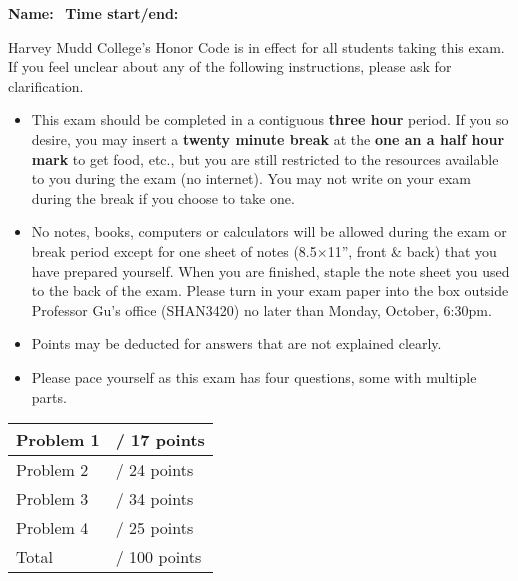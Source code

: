 \documentclass[letter, 12pt]{article}
\begin{document}
\begin{large}
\noindent \textbf{Name:} \hrulefill \hrulefill \hrulefill 
\mbox{ }\textbf{Time start/end:} \hrulefill \hrulefill

\vspace{.3in}
Harvey Mudd College's Honor Code is in effect for all students taking this
exam.  If you feel unclear about any of the following instructions,
please ask for clarification.

\begin{itemize}
\item This exam should be completed in a contiguous \textbf{three hour} period.
    If you so desire, you may insert a \textbf{twenty minute break} at the
    \textbf{one an a half hour mark} to get food, etc., but you are still restricted
    to the resources available to you during the exam (no internet). You may not
    write on your exam during the break if you choose to take one.
\item No notes, books, computers or calculators will be allowed during
  the exam or break period except for one sheet of notes (8.5$\times$11'', front \&
  back) that you have prepared yourself.  When you are finished,
  staple the note sheet you used to the back of the exam.  Please turn in your exam paper 
  into the box outside Professor Gu's office (SHAN3420) no later than Monday, October, 6:30pm.
\item Points may be deducted for answers that are not explained clearly.
\item Please pace yourself as this exam has four questions, some with
  multiple parts.
\end{itemize}
\end{large}
\vspace{.1 in}
\begin{center} \begin{Large}
\begin{tabular}[b]{|l|l|} \hline
 Problem 1 & \hspace{.5 in} / 17 points \\ \hline
 Problem 2 & \hspace{.5 in} / 24 points \\ \hline
 Problem 3 & \hspace{.5 in} / 34 points \\ \hline
 Problem 4 & \hspace{.5 in} / 25 points \\ \hline
 Total     & \hspace{.5 in} / 100 points \\ \hline 
\end{tabular} \end{Large}
\end{center}
\end{document}
